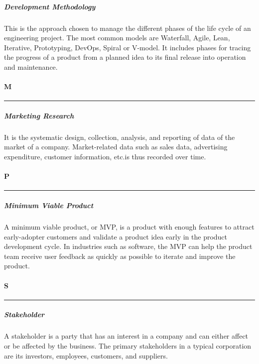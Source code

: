 \subparagraph{Development Methodology}
This is the approach chosen to manage the different phases of the life cycle of an engineering project. The most common models are Waterfall, Agile, Lean, Iterative, Prototyping, DevOps, Spiral or V-model. It includes phases for tracing the progress of a product from a planned idea to its final release into operation and maintenance. 

\paragraph{M}

\noindent\rule{16cm}{0.4pt}

\subparagraph{Marketing Research}
It is the systematic design, collection, analysis, and reporting of data of the market of a company. Market-related data such as sales data, advertising expenditure, customer information, etc.is thus recorded over time.


\paragraph{P}
\noindent\rule{16cm}{0.4pt}

\subparagraph{Minimum Viable Product}
A minimum viable product, or MVP, is a product with enough features to attract early-adopter customers and validate a product idea early in the product development cycle. In industries such as software, the MVP can help the product team receive user feedback as quickly as possible to iterate and improve the product.

\paragraph{S}
\noindent\rule{16cm}{0.4pt}

\subparagraph{Stakeholder}
A stakeholder is a party that has an interest in a company and can either affect or be affected by the business. The primary stakeholders in a typical corporation are its investors, employees, customers, and suppliers.




















